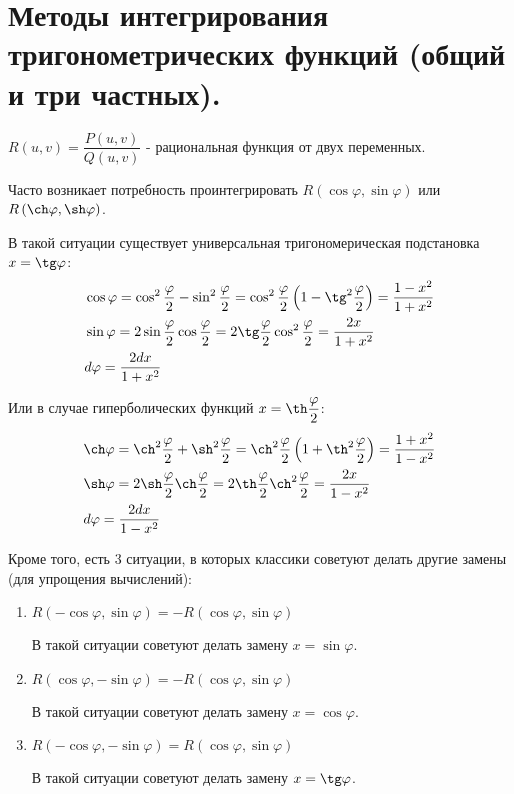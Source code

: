 \documentclass[../main.tex]{subfiles}
\begin{document}
\newpage
\section{Методы интегрирования тригонометрических функций (общий и три частных).}
\( R\left( u,v\right) = \dfrac{ P\left(u,v\right)}{ Q\left( u, v\right)} \) - рациональная функция от двух переменных. 

Часто возникает потребность проинтегрировать \( R\left( \cos \varphi , \sin \varphi \right) \) или \( R\left( \ch \varphi , \sh \varphi \right) \).

В такой ситуации существует универсальная тригономерическая подстановка \( x = \tg \varphi \):
\begin{equation*}
    \begin{aligned}
        &\cos \varphi =\cos^2 \dfrac{ \varphi}{ 2}- \sin^2 \dfrac{ \varphi}{ 2}= \cos^2 \dfrac{ \varphi}{ 2} \left( 1- \tg^2 \dfrac{ \varphi}{ 2}  \right)= \dfrac{ 1-x^2}{ 1+x^2}\\
        &\sin \varphi = 2 \sin \dfrac{ \varphi}{ 2} \cos \dfrac{ \varphi}{ 2} = 2 \tg \dfrac{ \varphi}{ 2} \cos^2 \dfrac{ \varphi}{ 2} = \dfrac{ 2x}{ 1+x^2}   \\      
        &d \varphi = \dfrac{ 2dx}{ 1+x^2} 
    \end{aligned}
\end{equation*}

Или в случае гиперболических функций \( x = \th \dfrac{ \varphi}{ 2} \):
\begin{equation*}
    \begin{aligned}
        &\ch \varphi =\ch^2 \dfrac{ \varphi}{ 2}+ \sh^2 \dfrac{ \varphi}{ 2}= \ch^2 \dfrac{ \varphi}{ 2} \left( 1+ \th^2 \dfrac{ \varphi}{ 2}  \right)= \dfrac{ 1+x^2}{ 1-x^2}\\
        &\sh \varphi = 2 \sh \dfrac{ \varphi}{ 2} \ch \dfrac{ \varphi}{ 2} = 2 \th \dfrac{ \varphi}{ 2} \ch^2 \dfrac{ \varphi}{ 2} = \dfrac{ 2x}{ 1-x^2}   \\      
        &d \varphi = \dfrac{ 2dx}{ 1-x^2} 
    \end{aligned}
\end{equation*}

Кроме того, есть 3 ситуации, в которых классики советуют делать другие замены (для упрощения вычислений):
\begin{enumerate}
    \item \( R\left( -\cos \varphi , \sin \varphi \right)=- R\left( \cos \varphi , \sin \varphi \right)  \)
    \par В такой ситуации советуют делать замену \( x = \sin \varphi \).
    \item \( R\left( \cos \varphi , -\sin \varphi \right)=- R\left( \cos \varphi , \sin \varphi \right)  \)
    \par В такой ситуации советуют делать замену \( x = \cos \varphi \).
    \item \( R\left( -\cos \varphi , -\sin \varphi \right)= R\left( \cos \varphi , \sin \varphi \right)  \)
    \par В такой ситуации советуют делать замену \( x = \tg \varphi \).
\end{enumerate}
\end{document}
